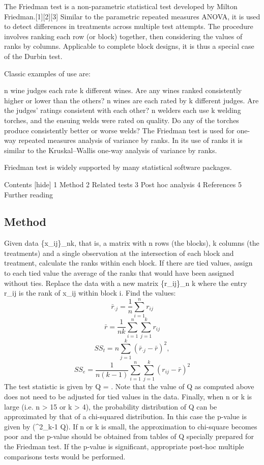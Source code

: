The Friedman test is a non-parametric statistical test developed by Milton Friedman.[1][2][3] Similar to the parametric repeated measures ANOVA, it is used to detect differences in treatments across multiple test attempts. The procedure involves ranking each row (or block) together, then considering the values of ranks by columns. Applicable to complete block designs, it is thus a special case of the Durbin test.

Classic examples of use are:

n wine judges each rate k different wines. Are any wines ranked consistently higher or lower than the others?
n wines are each rated by k different judges. Are the judges' ratings consistent with each other?
n welders each use k welding torches, and the ensuing welds were rated on quality. Do any of the torches produce consistently better or worse welds?
The Friedman test is used for one-way repeated measures analysis of variance by ranks. In its use of ranks it is similar to the Kruskal–Wallis one-way analysis of variance by ranks.

Friedman test is widely supported by many statistical software packages.

Contents  [hide] 
1	Method
2	Related tests
3	Post hoc analysis
4	References
5	Further reading

\subsection{Method}
Given data \{x_{ij}\}_{n\times k}, that is, a matrix with n rows (the blocks), k columns (the treatments) and a single observation at the intersection of each block and treatment, calculate the ranks within each block. If there are tied values, assign to each tied value the average of the ranks that would have been assigned without ties. Replace the data with a new matrix \{r_{ij}\}_{n \times k} where the entry r_{ij} is the rank of x_{ij} within block i.
Find the values:
\[\bar{r}_{\cdot j} = \frac{1}{n} \sum_{i=1}^n {r_{ij}} \]
\[\bar{r} = \frac{1}{nk}\sum_{i=1}^n \sum_{j=1}^k r_{ij}\]
\[SS_t = n\sum_{j=1}^k (\bar{r}_{\cdot j} - \bar{r})^2,\]
\[SS_e = \frac{1}{n(k-1)} \sum_{i=1}^n \sum_{j=1}^k (r_{ij} - \bar{r})^2\]
The test statistic is given by Q = . Note that the value of Q as computed above does not need to be adjusted for tied values in the data.
Finally, when n or k is large (i.e. n > 15 or k > 4), the probability distribution of Q can be approximated by that of a chi-squared distribution. In this case the p-value is given by (\chi^2_{k-1} \ge Q). If n or k is small, the approximation to chi-square becomes poor and the p-value should be obtained from tables of Q specially prepared for the Friedman test. If the p-value is significant, appropriate post-hoc multiple comparisons tests would be performed.
